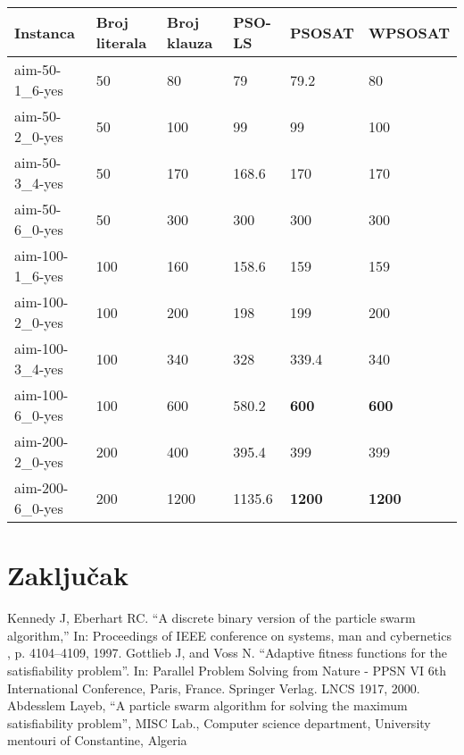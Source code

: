 \documentclass{article}
\begin{document}
\begin{table}[h!]
\centering
{}\label{tab:SAT} 
\begin{tabular}{ |p{3cm}|p{2cm}|p{2cm}||p{2cm}|p{2cm}|p{2cm}|  }
 \hline
 Instanca & Broj literala & Broj klauza & PSO-LS & PSOSAT & WPSOSAT\\
 \hline
 aim-50-1\_6-yes & 50 & 80 & 79 & 79.2 & 80\\
 \hline
 aim-50-2\_0-yes & 50 & 100 & 99 & 99 & 100\\
 \hline
 aim-50-3\_4-yes & 50 & 170 & 168.6 & 170 & 170\\
 \hline
 aim-50-6\_0-yes & 50 & 300 & 300 & 300 & 300\\
 \hline
 \hline
 aim-100-1\_6-yes & 100 & 160 & 158.6 & 159 & 159\\
 \hline
 aim-100-2\_0-yes & 100 & 200 & 198 & 199 & 200\\
 \hline
 aim-100-3\_4-yes & 100 & 340 & 328 & 339.4 & 340\\
 \hline
 aim-100-6\_0-yes & 100 & 600 & 580.2 & \textbf{600} & \textbf{600}\\
 \hline
 \hline
 aim-200-2\_0-yes & 200 & 400 & 395.4 & 399 & 399\\
 \hline
 aim-200-6\_0-yes & 200 & 1200 & 1135.6 & \textbf{1200} & \textbf{1200}\\
 \hline
\end{tabular}
\end{table}



\section{Zaključak}

\newpage
\begin{thebibliography}{9}
 Kennedy J, Eberhart RC. “A discrete binary version of the particle swarm algorithm,” In: Proceedings of IEEE conference on systems, man and cybernetics , p. 4104–4109, 1997.
 Gottlieb J, and Voss N. “Adaptive fitness functions for the satisfiability problem”. In: Parallel Problem Solving from Nature - PPSN VI 6th International Conference, Paris, France. Springer Verlag. LNCS 1917, 2000.
\bibitem{} Abdesslem Layeb, “A particle swarm algorithm for solving the maximum satisfiability problem”, MISC Lab., Computer science department, University mentouri of Constantine, Algeria
\end{thebibliography}
\end{document}
